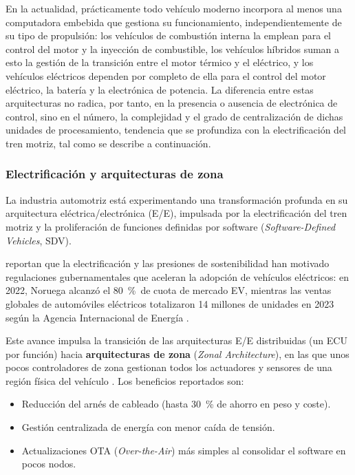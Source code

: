 En la actualidad, prácticamente todo vehículo moderno incorpora al menos una computadora embebida que gestiona su funcionamiento, independientemente de su tipo de propulsión: los vehículos de combustión interna la emplean para el control del motor y la inyección de combustible, los vehículos híbridos suman a esto la gestión de la transición entre el motor térmico y el eléctrico, y los vehículos eléctricos dependen por completo de ella para el control del motor eléctrico, la batería y la electrónica de potencia. La diferencia entre estas arquitecturas no radica, por tanto, en la presencia o ausencia de electrónica de control, sino en el número, la complejidad y el grado de centralización de dichas unidades de procesamiento, tendencia que se profundiza con la electrificación del tren motriz, tal como se describe a continuación.

\subsubsection{Electrificación y arquitecturas de zona}

La industria automotriz está experimentando una
transformación profunda en su arquitectura
eléctrica/electrónica (E/E), impulsada por la electrificación
del tren motriz y la proliferación de funciones definidas por
software (\textit{Software-Defined Vehicles}, SDV).

\citet{TechBriefs2024} reportan que la electrificación y las
presiones de sostenibilidad han motivado regulaciones
gubernamentales que aceleran la adopción de vehículos
eléctricos: en 2022, Noruega alcanzó el 80~\%~de cuota de
mercado EV, mientras las ventas globales de automóviles
eléctricos totalizaron 14 millones de unidades en 2023 según
la Agencia Internacional de Energía \citep{GMInsights2025}.

Este avance impulsa la transición de las arquitecturas E/E
distribuidas (un ECU por función) hacia
\textbf{arquitecturas de zona} (\textit{Zonal
	Architecture}), en las que unos pocos controladores de zona
gestionan todos los actuadores y sensores de una región
física del vehículo \citep{Promwad2025}.  Los beneficios
reportados son:

\begin{itemize}
	\item Reducción del arnés de cableado (hasta 30~\% de
	ahorro en peso y coste).
	\item Gestión centralizada de energía con menor caída de
	tensión.
	\item Actualizaciones OTA (\textit{Over-the-Air}) más
	simples al consolidar el software en pocos nodos.
\end{itemize}

